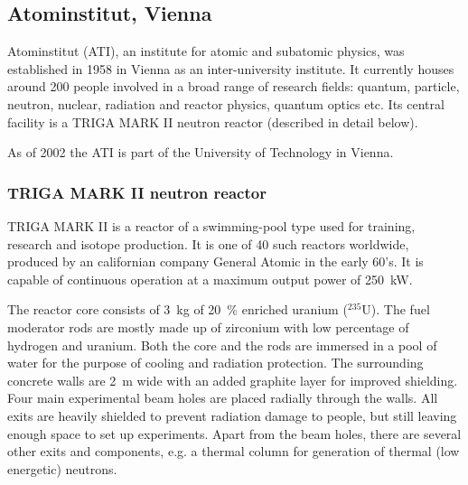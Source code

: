 \documentclass[12pt]{packages/mytustyle}  %
\begin{document}

\subsection{Atominstitut, Vienna}
Atominstitut (ATI), an institute for atomic and subatomic physics, was established in 1958 in Vienna as an inter-university institute. It currently houses around 200 people involved in a broad range of research fields: quantum, particle, neutron, nuclear, radiation and reactor physics, quantum optics etc. Its central facility is a TRIGA MARK II neutron reactor (described in detail below). 

As of 2002 the ATI is part of the University of Technology in Vienna.


\subsubsection{TRIGA MARK II neutron reactor}
TRIGA MARK II is a reactor of a swimming-pool type used for training, research and isotope production. It is one of 40 such reactors worldwide, produced by an californian company General Atomic in the early 60's. It is capable of continuous operation at a maximum output power of 250~kW. 

The reactor core consists of 3~kg of 20~\% enriched uranium ($^{235}$U). The fuel moderator rods are mostly made up of zirconium with low percentage of hydrogen and uranium. Both the core and the rods are immersed in a pool of water for the purpose of cooling and radiation protection. The surrounding concrete walls are 2~m wide with an added graphite layer for improved shielding. Four main experimental beam holes are placed radially through the walls. All exits are heavily shielded to prevent radiation damage to people, but still leaving enough space to set up experiments. Apart from the beam holes, there are several other exits and components, e.g. a thermal column for generation of thermal (low energetic) neutrons.
\end{document}
